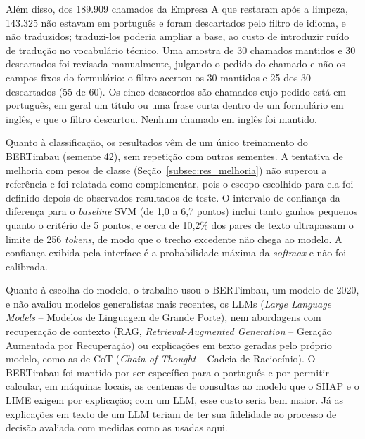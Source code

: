 \documentclass[
    12pt,                %
    openright,           %
    oneside,             %
    a4paper,             %
    english,             %
    brazil               %
]{abntex2}
\begin{document}
Além disso, dos 189.909 chamados da Empresa A que restaram após a limpeza, 143.325 não estavam em português e foram descartados pelo filtro de idioma, e não traduzidos; traduzi-los poderia ampliar a base, ao custo de introduzir ruído de tradução no vocabulário técnico. Uma amostra de 30 chamados mantidos e 30 descartados foi revisada manualmente, julgando o pedido do chamado e não os campos fixos do formulário: o filtro acertou os 30 mantidos e 25 dos 30 descartados (55 de 60). Os cinco desacordos são chamados cujo pedido está em português, em geral um título ou uma frase curta dentro de um formulário em inglês, e que o filtro descartou. Nenhum chamado em inglês foi mantido. %

Quanto à classificação, os resultados vêm de um único treinamento do BERTimbau (semente 42), sem repetição com outras sementes. A tentativa de melhoria com pesos de classe (Seção~\ref{subsec:res_melhoria}) não superou a referência e foi relatada como complementar, pois o escopo escolhido para ela foi definido depois de observados resultados de teste. O intervalo de confiança da diferença para o \textit{baseline} SVM (de 1,0 a 6,7 pontos) inclui tanto ganhos pequenos quanto o critério de 5 pontos, e cerca de 10,2\% dos pares de texto ultrapassam o limite de 256 \textit{tokens}, de modo que o trecho excedente não chega ao modelo. A confiança exibida pela interface é a probabilidade máxima da \textit{softmax} e não foi calibrada.

Quanto à escolha do modelo, o trabalho usou o BERTimbau, um modelo de 2020, e não avaliou modelos generalistas mais recentes, os LLMs (\textit{Large Language Models} -- Modelos de Linguagem de Grande Porte), nem abordagens com recuperação de contexto (RAG, \textit{Retrieval-Augmented Generation} -- Geração Aumentada por Recuperação) ou explicações em texto geradas pelo próprio modelo, como as de CoT (\textit{Chain-of-Thought} -- Cadeia de Raciocínio). O BERTimbau foi mantido por ser específico para o português e por permitir calcular, em máquinas locais, as centenas de consultas ao modelo que o SHAP e o LIME exigem por explicação; com um LLM, esse custo seria bem maior. Já as explicações em texto de um LLM teriam de ter sua fidelidade ao processo de decisão avaliada com medidas como as usadas aqui.
\end{document}
